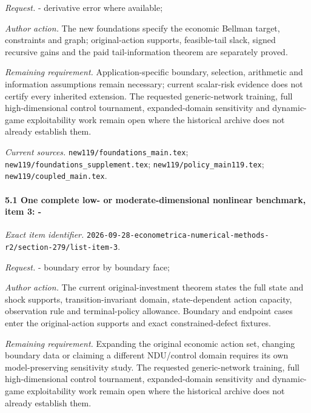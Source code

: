 \par\emph{Request.} - derivative error where available;

\par\emph{Author action.} The new foundations specify the economic Bellman target, constraints and graph; original-action supports, feasible-tail slack, signed recursive gains and the paid tail-information theorem are separately proved.

\par\emph{Remaining requirement.} Application-specific boundary, selection, arithmetic and information assumptions remain necessary; current scalar-risk evidence does not certify every inherited extension. The requested generic-network training, full high-dimensional control tournament, expanded-domain sensitivity and dynamic-game exploitability work remain open where the historical archive does not already establish them.

\par\emph{Current sources.} \nolinkurl{new119/foundations_main.tex}; \nolinkurl{new119/foundations_supplement.tex}; \nolinkurl{new119/policy_main119.tex}; \nolinkurl{new119/coupled_main.tex}.

\paragraph{5.1 One complete low- or moderate-dimensional nonlinear benchmark, item 3: -}

\emph{Exact item identifier.} \nolinkurl{2026-09-28-econometrica-numerical-methods-r2/section-279/list-item-3}.

\par\emph{Request.} - boundary error by boundary face;

\par\emph{Author action.} The current original-investment theorem states the full state and shock supports, transition-invariant domain, state-dependent action capacity, observation rule and terminal-policy allowance. Boundary and endpoint cases enter the original-action supports and exact constrained-defect fixtures.

\par\emph{Remaining requirement.} Expanding the original economic action set, changing boundary data or claiming a different NDU/\allowbreak{}control domain requires its own model-preserving sensitivity study. The requested generic-network training, full high-dimensional control tournament, expanded-domain sensitivity and dynamic-game exploitability work remain open where the historical archive does not already establish them.


